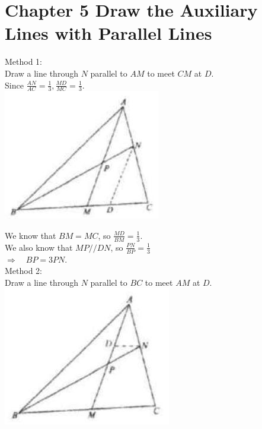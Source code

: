 \documentclass[10pt]{article}
\begin{document}
\section*{Chapter 5 Draw the Auxiliary Lines with Parallel Lines}
Method 1:\\
Draw a line through \(N\) parallel to \(A M\) to meet \(C M\) at \(D\).\\
Since \(\frac{A N}{A C}=\frac{1}{3}, \frac{M D}{M C}=\frac{1}{3}\).\\
\includegraphics[max width=\textwidth, center]{2025_04_17_97bc1f7e44d93c271a88g-139}

We know that \(B M=M C\), so \(\frac{M D}{B M}=\frac{1}{3}\).\\
We also know that \(M P / / D N\), so \(\frac{P N}{B P}=\frac{1}{3}\)\\
\(\Rightarrow \quad B P=3 P N\).\\
Method 2:\\
Draw a line through \(N\) parallel to \(B C\) to meet \(A M\) at \(D\).\\
\includegraphics[max width=\textwidth, center]{2025_04_17_97bc1f7e44d93c271a88g-139(2)}
\end{document}
